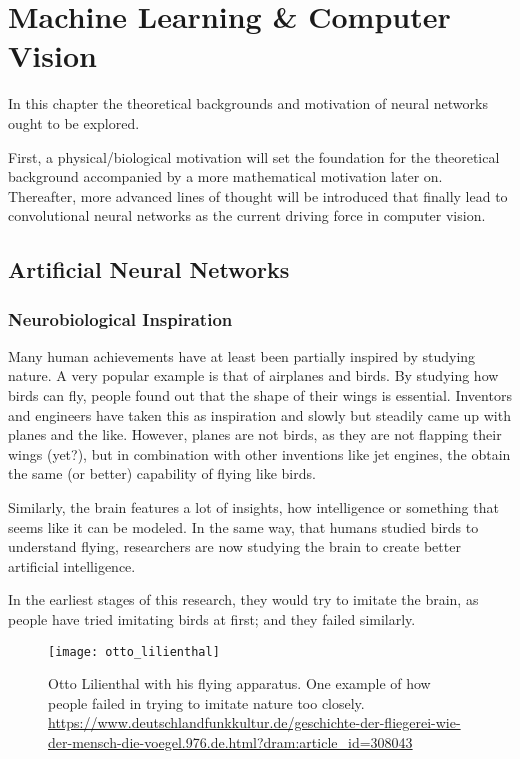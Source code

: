 \setchapterpreamble[u]{\margintoc}
\chapter{Machine Learning \& Computer Vision}
In this chapter the theoretical backgrounds and motivation of neural networks ought to be explored.

First, a physical/biological motivation will set the foundation for the theoretical background accompanied by a more mathematical motivation later on.
Thereafter, more advanced lines of thought will be introduced that finally lead to convolutional neural networks as the current driving force in computer vision.

\section[Artificial NNs]{Artificial Neural Networks}

\subsection[Inspiration]{Neurobiological Inspiration}

Many human achievements have at least been partially inspired by studying nature.
A very popular example is that of airplanes and birds.
By studying how birds can fly, people found out that the shape of their wings is essential.
Inventors and engineers have taken this as inspiration and slowly but steadily came up with planes and the like.
However, planes are not birds, as they are not flapping their wings (yet?), but in combination with other inventions like jet engines, the obtain the same (or better) capability of flying like birds.

Similarly, the brain features a lot of insights, how intelligence or something that seems like it can be modeled.
In the same way, that humans studied birds to understand flying, researchers are now studying the brain to create better artificial intelligence.

In the earliest stages of this research, they would try to imitate the brain, as people have tried imitating birds at first; and they failed similarly.
\begin{figure}
    \texttt{[image: otto\_lilienthal]}
    \caption[]{Otto Lilienthal with his flying apparatus. One example of how people failed in trying to imitate nature too closely. \url{https://www.deutschlandfunkkultur.de/geschichte-der-fliegerei-wie-der-mensch-die-voegel.976.de.html?dram:article_id=308043}}
\end{figure}

